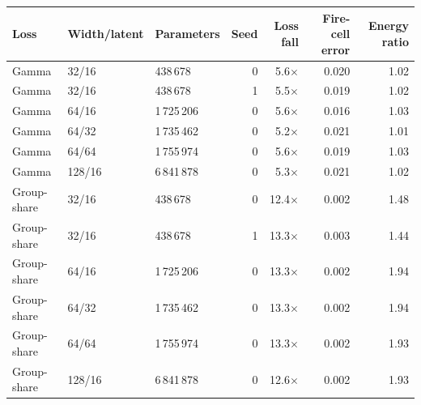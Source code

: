 \begin{tabular}{lllrrrr}
\toprule
Loss & Width/latent & Parameters & Seed & Loss fall & Fire-cell error & Energy ratio \\
\midrule
Gamma & 32/16 & 438\,678 & 0 & 5.6$\times$ & 0.020 & 1.02 \\
Gamma & 32/16 & 438\,678 & 1 & 5.5$\times$ & 0.019 & 1.02 \\
Gamma & 64/16 & 1\,725\,206 & 0 & 5.6$\times$ & 0.016 & 1.03 \\
Gamma & 64/32 & 1\,735\,462 & 0 & 5.2$\times$ & 0.021 & 1.01 \\
Gamma & 64/64 & 1\,755\,974 & 0 & 5.6$\times$ & 0.019 & 1.03 \\
Gamma & 128/16 & 6\,841\,878 & 0 & 5.3$\times$ & 0.021 & 1.02 \\
\midrule
Group-share & 32/16 & 438\,678 & 0 & 12.4$\times$ & 0.002 & 1.48 \\
Group-share & 32/16 & 438\,678 & 1 & 13.3$\times$ & 0.003 & 1.44 \\
Group-share & 64/16 & 1\,725\,206 & 0 & 13.3$\times$ & 0.002 & 1.94 \\
Group-share & 64/32 & 1\,735\,462 & 0 & 13.3$\times$ & 0.002 & 1.94 \\
Group-share & 64/64 & 1\,755\,974 & 0 & 13.3$\times$ & 0.002 & 1.93 \\
Group-share & 128/16 & 6\,841\,878 & 0 & 12.6$\times$ & 0.002 & 1.93 \\
\bottomrule
\end{tabular}
